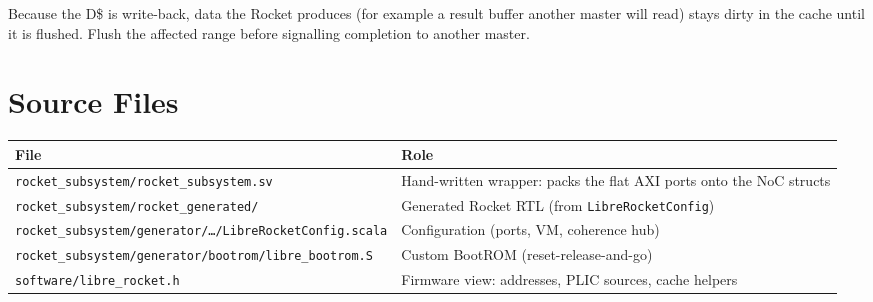 \begin{docnote}
Because the D\$ is write-back, data the Rocket produces (for example a result buffer another master will
read) stays dirty in the cache until it is flushed. Flush the affected range before signalling
completion to another master.
\end{docnote}

\section{Source Files}

\begin{tabular}{@{}ll@{}}
\toprule
\textbf{File} & \textbf{Role} \\
\midrule
\texttt{rocket\_subsystem/rocket\_subsystem.sv} & Hand-written wrapper: packs the flat AXI ports onto the NoC structs \\
\texttt{rocket\_subsystem/rocket\_generated/} & Generated Rocket RTL (from \texttt{LibreRocketConfig}) \\
\texttt{rocket\_subsystem/generator/\ldots/LibreRocketConfig.scala} & Configuration (ports, VM, coherence hub) \\
\texttt{rocket\_subsystem/generator/bootrom/libre\_bootrom.S} & Custom BootROM (reset-release-and-go) \\
\texttt{software/libre\_rocket.h} & Firmware view: addresses, PLIC sources, cache helpers \\
\bottomrule
\end{tabular}

\newpage
